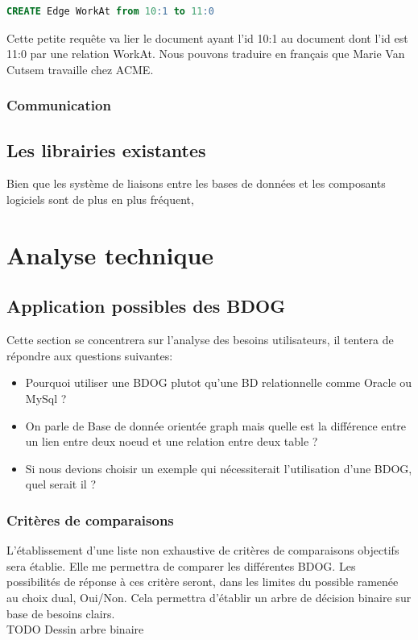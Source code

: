\documentclass[a4paper,fleqn,12pt]{report}
\begin{document}
\begin{lstlisting}[language=SQL]
CREATE Edge WorkAt from 10:1 to 11:0
\end{lstlisting}

Cette petite requête va lier le document ayant l'id 10:1 au document dont l'id est 11:0 par une relation WorkAt. Nous pouvons traduire en français que Marie Van Cutsem travaille chez ACME.


\section{Communication}



\chapter{Les librairies existantes}

Bien que les système de liaisons entre les bases de données et les composants logiciels sont de plus en plus fréquent, 

\part{Analyse technique}
\chapter{Application possibles des BDOG}
Cette section se concentrera sur l'analyse des besoins utilisateurs, il tentera de répondre aux questions suivantes: 
\begin{itemize}
\item Pourquoi utiliser une BDOG plutot qu'une BD relationnelle comme Oracle ou MySql ?
\item On parle de Base de donnée orientée graph mais quelle est la différence entre un lien entre deux noeud et une relation entre deux table ?
\item Si nous devions choisir un exemple qui nécessiterait l'utilisation d'une BDOG, quel serait il ?
\end{itemize}
\section{Critères de comparaisons}
L'établissement d'une liste non exhaustive de critères de comparaisons objectifs sera établie. Elle me permettra de comparer les différentes BDOG. Les possibilités de réponse à ces critère seront, dans les limites du possible ramenée au choix dual, Oui/Non. Cela permettra d'établir un arbre de décision binaire sur base de besoins clairs.\\TODO Dessin arbre binaire
\end{document}
